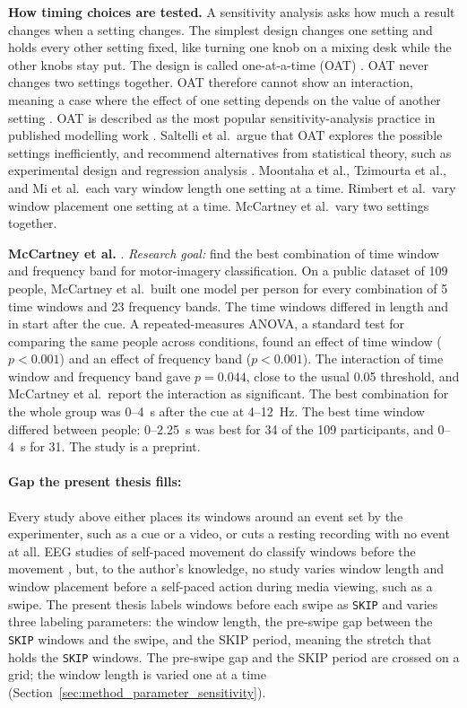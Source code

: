 \documentclass[12pt,a4paper]{report}
\begin{document}
\textbf{How timing choices are tested.} A sensitivity analysis asks how much a result changes when a setting changes. The simplest design changes one setting and holds every other setting fixed, like turning one knob on a mixing desk while the other knobs stay put. The design is called one-at-a-time (OAT) \cite{saltelli_global_2008}. OAT never changes two settings together. OAT therefore cannot show an interaction, meaning a case where the effect of one setting depends on the value of another setting \cite{saltelli_global_2008}. OAT is described as the most popular sensitivity-analysis practice in published modelling work \cite{saltelli_how_2010}. Saltelli et al.\ argue that OAT explores the possible settings inefficiently, and recommend alternatives from statistical theory, such as experimental design and regression analysis \cite{saltelli_how_2010}. Moontaha et al., Tzimourta et al., and Mi et al.\ each vary window length one setting at a time. Rimbert et al.\ vary window placement one setting at a time. McCartney et al.\ vary two settings together.

\textbf{McCartney et al.} \cite{mccartney_optimal_2026}. \emph{Research goal:} find the best combination of time window and frequency band for motor-imagery classification. On a public dataset of 109 people, McCartney et al.\ built one model per person for every combination of 5 time windows and 23 frequency bands. The time windows differed in length and in start after the cue. A repeated-measures ANOVA, a standard test for comparing the same people across conditions, found an effect of time window ($p<0.001$) and an effect of frequency band ($p<0.001$). The interaction of time window and frequency band gave $p=0.044$, close to the usual 0.05 threshold, and McCartney et al.\ report the interaction as significant. The best combination for the whole group was 0--4~s after the cue at 4--12~Hz. The best time window differed between people: 0--2.25~s was best for 34 of the 109 participants, and 0--4~s for 31. The study is a preprint.

\paragraph{Gap the present thesis fills:} Every study above either places its windows around an event set by the experimenter, such as a cue or a video, or cuts a resting recording with no event at all. EEG studies of self-paced movement do classify windows before the movement \cite{lew_detection_2012}, but, to the author's knowledge, no study varies window length and window placement before a self-paced action during media viewing, such as a swipe. The present thesis labels windows before each swipe as \texttt{SKIP} and varies three labeling parameters: the window length, the pre-swipe gap between the \texttt{SKIP} windows and the swipe, and the SKIP period, meaning the stretch that holds the \texttt{SKIP} windows. The pre-swipe gap and the SKIP period are crossed on a grid; the window length is varied one at a time (Section~\ref{sec:method_parameter_sensitivity}).
\end{document}
